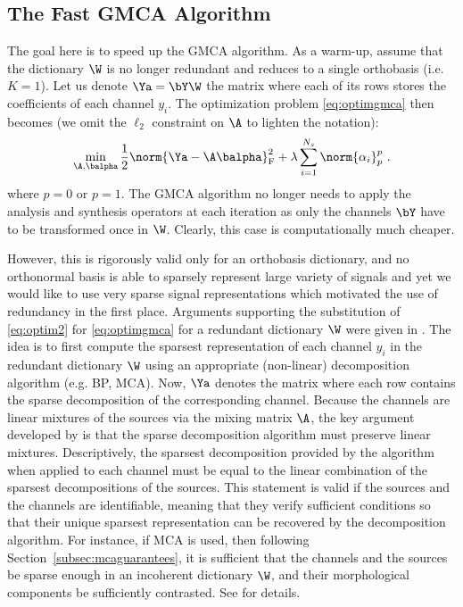 \subsection{The Fast GMCA Algorithm}
\label{gmca_algo}
\label{fast_gmca}
The goal here is to speed up the GMCA algorithm. As a warm-up, assume that the dictionary ${\W}$ is no longer redundant and reduces to a single orthobasis (i.e. $K=1$). 
Let us denote $\Ya=\bY\W$ the matrix where each of its rows stores the coefficients of each channel $y_i$. The optimization problem \eqref{eq:optimgmca} then becomes (we omit the $\ell_2$ constraint on $\A$ to lighten the notation):
\begin{equation}
\label{eq:optim2}
\min_{{\A},{\bf \balpha}} \frac{1}{2}\norm{\Ya - {\A} \balpha}_\mathrm{F}^2 + \lambda \sum_{i=1}^{N_s} \norm{\alpha_{i}}_p^p ~.
\end{equation}
where $p=0$ or $p=1$. The GMCA algorithm no longer needs to apply the analysis and synthesis operators at each iteration as only the channels $\bY$ have to be transformed once in $\W$. Clearly, this case is computationally much cheaper. 

However, this is rigorously valid only for an orthobasis dictionary, and no orthonormal basis is able to sparsely represent large variety of signals and yet we would like to use very sparse signal representations which motivated the use of redundancy in the first place. Arguments supporting the substitution of \eqref{eq:optim2} for \eqref{eq:optimgmca} for a redundant dictionary ${\W}$ were given in \citet{starck:bobin07,bobin08_aiep}. The idea is to first compute the sparsest representation of each channel $y_i$ in the redundant dictionary $\W$ using an appropriate (non-linear) decomposition algorithm (e.g. BP, MCA). Now, $\Ya$ denotes the matrix where each row contains the sparse decomposition of the corresponding channel. Because the channels are linear mixtures of the sources via the mixing matrix $\A$, the key argument developed by \citet{starck:bobin07} is that the sparse decomposition algorithm must preserve linear mixtures. Descriptively, the sparsest decomposition provided by the algorithm when applied to each channel must be equal to the linear combination of the sparsest decompositions of the sources. This statement is valid if the sources and the channels are identifiable, meaning that they verify sufficient conditions so that their unique sparsest representation can be recovered by the decomposition algorithm. For instance, if MCA is used, then following Section~\ref{subsec:mcaguarantees}, it is sufficient that the channels and the sources be sparse enough in an incoherent dictionary $\W$, and their morphological components be sufficiently contrasted. See \citet{starck:bobin07,bobin08_aiep} for details.

